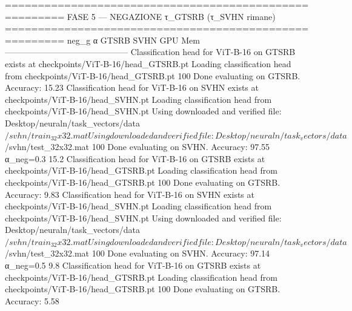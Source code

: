 =======================================================
  FASE 5 — NEGAZIONE τ_GTSRB (τ_SVHN rimane)
=======================================================
  neg_g α           GTSRB     SVHN    GPU Mem
  --------------------------------------------
Classification head for ViT-B-16 on GTSRB exists at checkpoints/ViT-B-16/head_GTSRB.pt
Loading classification head from checkpoints/ViT-B-16/head_GTSRB.pt
100%
Done evaluating on GTSRB. Accuracy: 15.23%
Classification head for ViT-B-16 on SVHN exists at checkpoints/ViT-B-16/head_SVHN.pt
Loading classification head from checkpoints/ViT-B-16/head_SVHN.pt
Using downloaded and verified file: Desktop/neuraln/task_vectors/data$/svhn/train_32x32.mat
Using downloaded and verified file: Desktop/neuraln/task_vectors/data$/svhn/test_32x32.mat
100%
Done evaluating on SVHN. Accuracy: 97.55%
  α_neg=0.3         15.2%
Classification head for ViT-B-16 on GTSRB exists at checkpoints/ViT-B-16/head_GTSRB.pt
Loading classification head from checkpoints/ViT-B-16/head_GTSRB.pt
100%
Done evaluating on GTSRB. Accuracy: 9.83%
Classification head for ViT-B-16 on SVHN exists at checkpoints/ViT-B-16/head_SVHN.pt
Loading classification head from checkpoints/ViT-B-16/head_SVHN.pt
Using downloaded and verified file: Desktop/neuraln/task_vectors/data$/svhn/train_32x32.mat
Using downloaded and verified file: Desktop/neuraln/task_vectors/data$/svhn/test_32x32.mat
100%
Done evaluating on SVHN. Accuracy: 97.14%
  α_neg=0.5          9.8%
Classification head for ViT-B-16 on GTSRB exists at checkpoints/ViT-B-16/head_GTSRB.pt
Loading classification head from checkpoints/ViT-B-16/head_GTSRB.pt
100%
Done evaluating on GTSRB. Accuracy: 5.58%
